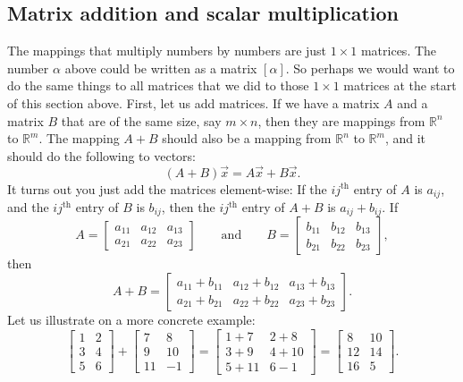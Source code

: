 \subsection{Matrix addition and scalar multiplication}

The mappings that multiply numbers by numbers are just $1 \times 1$ matrices.  The
number $\alpha$ above could be written as a matrix $[\alpha]$.
So perhaps we would want to do the same things to all matrices that we
did to those $1 \times 1$ matrices at the start of this section above.
First, let us add matrices.
If we have a matrix $A$ and a matrix $B$ that are of the same size,
say $m \times n$, then they are mappings from
${\mathbb{R}}^n$ to ${\mathbb{R}}^m$.  The mapping $A+B$ should also be a mapping from
${\mathbb{R}}^n$ to ${\mathbb{R}}^m$, and it should do the following to
vectors:
\begin{equation*}
(A+B) \vec{x} = A\vec{x} + B \vec{x} .
\end{equation*}
It turns out you just add the matrices element-wise:  If the
$ij^{\text{th}}$ entry of $A$ is $a_{ij}$, and the
$ij^{\text{th}}$ entry of $B$ is $b_{ij}$, then the
$ij^{\text{th}}$ entry of $A+B$ is $a_{ij} + b_{ij}$.  If
\begin{equation*}
A = 
\begin{bmatrix}
a_{11} & a_{12} & a_{13}  \\
a_{21} & a_{22} & a_{23}
\end{bmatrix}
\qquad \text{and} \qquad
B = 
\begin{bmatrix}
b_{11} & b_{12} & b_{13}  \\
b_{21} & b_{22} & b_{23}
\end{bmatrix} ,
\end{equation*}
then
\begin{equation*}
A+B = 
\begin{bmatrix}
a_{11} + b_{11} & a_{12} + b_{12} & a_{13} + b_{13}  \\
a_{21} + b_{21} & a_{22} + b_{22} & a_{23} + b_{23}
\end{bmatrix} .
\end{equation*}
Let us illustrate on a more concrete example:
\begin{equation*}
\begin{bmatrix}
1 & 2 \\
3 & 4 \\
5 & 6
\end{bmatrix}
+
\begin{bmatrix}
7 & 8 \\
9 & 10 \\
11 & -1
\end{bmatrix}
=
\begin{bmatrix}
1+7 & 2+8 \\
3+9 & 4+10 \\
5+11 & 6-1
\end{bmatrix}
=
\begin{bmatrix}
8 & 10 \\
12 & 14 \\
16 & 5
\end{bmatrix} .
\end{equation*}
